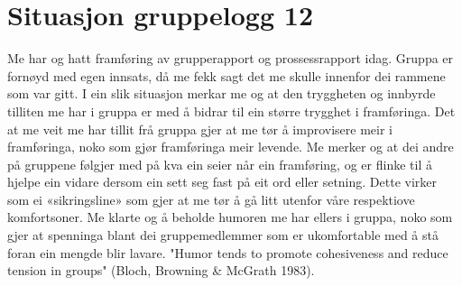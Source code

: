 \section{Situasjon gruppelogg 12}
Me har og hatt framføring av grupperapport og prossessrapport idag. Gruppa er fornøyd med egen innsats, då me fekk sagt det me skulle innenfor dei rammene som var gitt. I ein slik situasjon merkar me og at den tryggheten og innbyrde tilliten me har i gruppa er med å bidrar til ein større trygghet i framføringa. Det at me veit me har tillit frå gruppa gjer at me tør å improvisere meir i framføringa, noko som gjør framføringa meir levende. Me merker og at dei andre på gruppene følgjer med på kva ein seier når ein framføring, og er flinke til å hjelpe ein vidare dersom ein sett seg fast på eit ord eller setning. Dette virker som ei «sikringsline» som gjer at me tør å gå litt utenfor våre respektiove komfortsoner.  Me klarte og å beholde humoren me har ellers i gruppa, noko som gjer at spenninga blant dei gruppemedlemmer som er ukomfortable med å stå foran ein mengde blir lavare. "Humor tends to promote cohesiveness and reduce tension in groups" (Bloch, Browning \& McGrath 1983).
